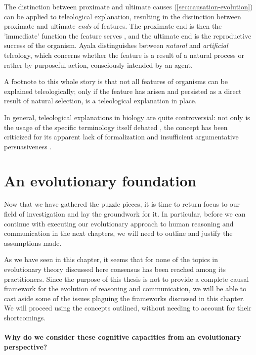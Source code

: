 The distinction between proximate and ultimate causes (\cref{sec:causation-evolution}) can be applied to teleological explanation, resulting in the distinction between proximate and ultimate \emph{ends} of features. The proximate end is then the 'immediate' function the feature serves , and the ultimate end is the reproductive success of the organism.
 Ayala distinguishes between \emph{natural} and \emph{artificial} teleology, which concerns whether the feature is a result of a natural process or rather by purposeful action, consciously intended by an agent.

A footnote to this whole story is that not all features of organisms can be explained teleologically; only if the feature has arisen and persisted as a direct result of natural selection, is a teleological explanation in place.

In general, teleological explanations in biology are quite controversial: not only is the usage of the specific terminology itself debated \citep[p.~27 and references therein]{Ayala99}, the concept has been criticized for its apparent lack of formalization and insufficient argumentative persuasiveness \citep[p.~83]{Baedke2021}.

\section{An evolutionary foundation}

Now that we have gathered the puzzle pieces, it is time to return focus to our field of investigation and lay the groundwork for it. In particular, before we can continue with executing our evolutionary approach to human reasoning and communication in the next chapters, we will need to outline and justify the assumptions made.

As we have seen in this chapter, it seems that for none of the topics in evolutionary theory discussed here consensus has been reached among its practitioners. Since the purpose of this thesis is not to provide a complete causal framework for the evolution of reasoning and communication, we will be able to cast aside some of the issues plaguing the frameworks discussed in this chapter. We will proceed using the concepts outlined, without needing to account for their shortcomings.

\paragraph{Why do we consider these cognitive capacities from an evolutionary perspective?}

